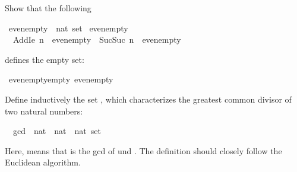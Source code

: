 %
\begin{isabellebody}%
\def\isabellecontext{a{\isadigit{5}}}%
\isamarkupfalse%
%
\isamarkuptrue%
%
\isamarkuptrue%
%
\begin{isamarkuptext}%
Show that the following%
\end{isamarkuptext}%
\isamarkuptrue%
\ evenempty\ {\isacharcolon}{\isacharcolon}\ {\isachardoublequote}nat\ set{\isachardoublequote}\isanewline
\isamarkupfalse%
\ evenempty\isanewline
\ \ \isanewline
\ \ Add{}Ie{\isacharcolon}\ {\isachardoublequote}n\ {\isasymin}\ evenempty\ {\isasymLongrightarrow}\ Suc{\isacharparenleft}Suc\ n{\isacharparenright}\ {\isasymin}\ evenempty{\isachardoublequote}\isamarkupfalse%
%
\begin{isamarkuptext}%
defines the empty set:%
\end{isamarkuptext}%
\isamarkuptrue%
\ evenempty{\isacharunderscore}empty{\isacharcolon}\ {\isachardoublequote}evenempty\ {\isacharequal}\ {\isacharbraceleft}{\isacharbraceright}{\isachardoublequote}\isamarkupfalse%
\isamarkupfalse%
%
\isamarkuptrue%
%
\begin{isamarkuptext}%
Define inductively the set , which characterizes
the greatest common divisor of two natural numbers:%
\end{isamarkuptext}%
\isamarkuptrue%
\ \ gcd\ {\isacharcolon}{\isacharcolon}\ {\isachardoublequote}{\isacharparenleft}nat\ {\isasymtimes}\ nat\ {\isasymtimes}\ nat{\isacharparenright}\ set{\isachardoublequote}\isamarkupfalse%
%
\begin{isamarkuptext}%
Here,  means that  is the gcd
of  und . The definition should closely follow the
Euclidean algorithm.


\end{isamarkuptext}
\end{isabellebody}
